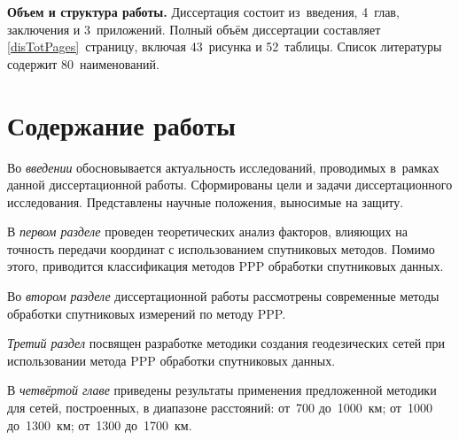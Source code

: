 
\textbf{Объем и структура работы.} Диссертация состоит из~введения, 4~глав,
заключения и 3~приложений.
Полный объём диссертации составляет \ref*{disTotPages}~страницу, включая
43~рисунка и 52~таблицы.
Список литературы содержит 80~наименований.



\newpage

\section*{Содержание работы}
Во \textit{введении} обосновывается актуальность исследований, проводимых в~рамках данной диссертационной работы. Сформированы цели и задачи диссертационного исследования. Представлены научные положения, выносимые на защиту.

В \textit{первом разделе} проведен теоретических анализ
факторов, влияющих на точность передачи координат с использованием спутниковых методов. Помимо этого, приводится классификация методов PPP обработки спутниковых данных.



Во \textit{втором разделе} диссертационной работы рассмотрены современные методы обработки спутниковых измерений по методу PPP. 


\textit{Третий раздел} посвящен разработке методики создания геодезических сетей при использовании метода PPP обработки спутниковых данных.



%
В \textit{четвёртой главе} приведены результаты применения предложенной методики для сетей, построенных, в диапазоне расстояний: от~700 до~1000~км; от~1000 до~1300~км; от~1300 до~1700~км.

